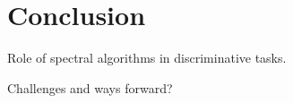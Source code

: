 \section{Conclusion}
\label{sec:conclusion}

Role of spectral algorithms in discriminative tasks.

Challenges and ways forward?

